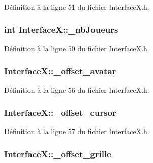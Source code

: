 Définition à la ligne 51 du fichier InterfaceX.h.

\hypertarget{a00011_aef41c15d24fd691d1e3c05b387a8fd96}{
\subsubsection[{\_\-nbJoueurs}]{\setlength{\rightskip}{0pt plus 5cm}int {\bf InterfaceX::\_\-nbJoueurs}}}
\label{a00011_aef41c15d24fd691d1e3c05b387a8fd96}


Définition à la ligne 50 du fichier InterfaceX.h.

\hypertarget{a00011_a21d0a8fbd79bd252269cad9461e97fa4}{
\subsubsection[{\_\-offset\_\-avatar}]{ {\bf InterfaceX::\_\-offset\_\-avatar}}}
\label{a00011_a21d0a8fbd79bd252269cad9461e97fa4}


Définition à la ligne 56 du fichier InterfaceX.h.

\hypertarget{a00011_a66835fb4e65c2b55a5f49bb2dee0d15d}{
\subsubsection[{\_\-offset\_\-cursor}]{ {\bf InterfaceX::\_\-offset\_\-cursor}}}
\label{a00011_a66835fb4e65c2b55a5f49bb2dee0d15d}


Définition à la ligne 57 du fichier InterfaceX.h.

\hypertarget{a00011_a722c39f202350477d29c25ed9f71eadb}{
\subsubsection[{\_\-offset\_\-grille}]{ {\bf InterfaceX::\_\-offset\_\-grille}}}
\label{a00011_a722c39f202350477d29c25ed9f71eadb}


